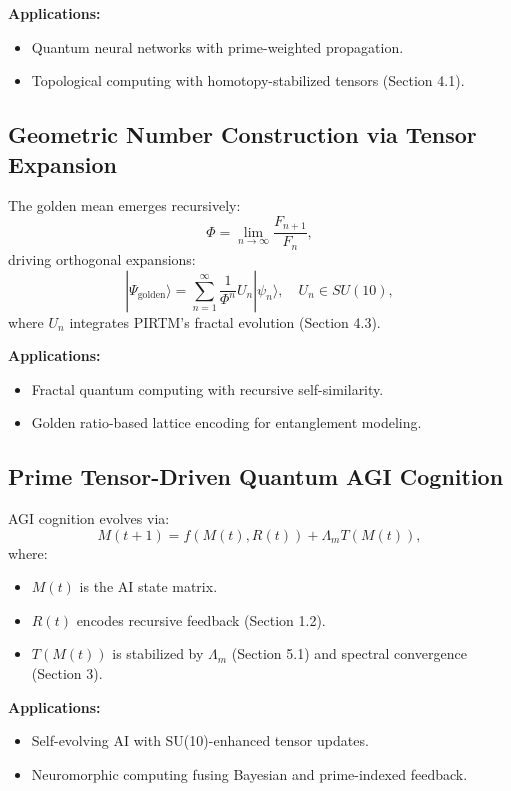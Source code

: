 \documentclass{article}
\theoremstyle{plain}
\begin{document}
\textbf{Applications:}
\begin{itemize}
    \item Quantum neural networks with prime-weighted propagation.
    \item Topological computing with homotopy-stabilized tensors (Section 4.1).
\end{itemize}

\subsection{Geometric Number Construction via Tensor Expansion}
The golden mean emerges recursively:
\begin{equation}
\Phi = \lim_{n\to\infty} \frac{F_{n+1}}{F_n},
\end{equation}
driving orthogonal expansions:
\begin{equation}
|\Psi_{\text{golden}}\rangle = \sum_{n=1}^{\infty} \frac{1}{\Phi^n} U_n |\psi_n\rangle, \quad U_n \in SU(10),
\end{equation}
where \( U_n \) integrates PIRTM’s fractal evolution (Section 4.3).

\textbf{Applications:}
\begin{itemize}
    \item Fractal quantum computing with recursive self-similarity.
    \item Golden ratio-based lattice encoding for entanglement modeling.
\end{itemize}

\subsection{Prime Tensor-Driven Quantum AGI Cognition}
AGI cognition evolves via:
\begin{equation}
M(t+1) = f(M(t), R(t)) + \Lambda_m T(M(t)),
\end{equation}
where:
\begin{itemize}
    \item \( M(t) \) is the AI state matrix.
    \item \( R(t) \) encodes recursive feedback (Section 1.2).
    \item \( T(M(t)) \) is stabilized by \( \Lambda_m \) (Section 5.1) and spectral convergence (Section 3).
\end{itemize}
\textbf{Applications:}
\begin{itemize}
    \item Self-evolving AI with SU(10)-enhanced tensor updates.
    \item Neuromorphic computing fusing Bayesian and prime-indexed feedback.
\end{itemize}
\end{document}
